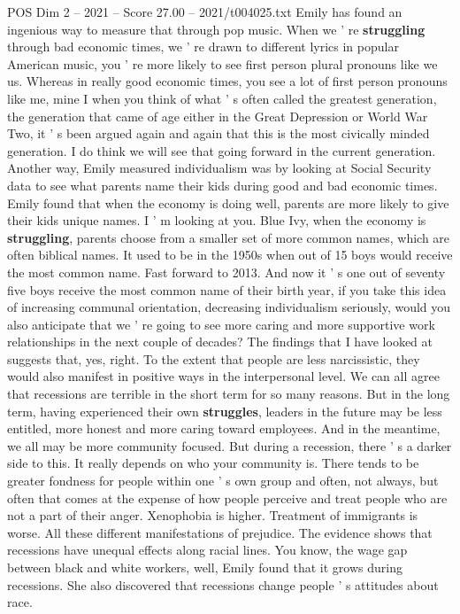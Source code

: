 \begin{textsample}{POS Dim 2 – 2021 – Score 27.00 – 2021/t004025.txt}
Emily has found an ingenious way to measure that through pop music.
When we ' re \textbf{struggling} through bad economic times, we ' re drawn to different lyrics in popular American music, you ' re more likely to see first person plural pronouns like we us.
Whereas in really good economic times, you see a lot of first person pronouns like me, mine I when you think of what ' s often called the greatest generation, the generation that came of age either in the Great Depression or World War Two, it ' s been argued again and again that this is the most civically minded generation.
I do think we will see that going forward in the current generation.
Another way, Emily measured individualism was by looking at Social Security data to see what parents name their kids during good and bad economic times.
Emily found that when the economy is doing well, parents are more likely to give their kids unique names.
I ' m looking at you.
Blue Ivy, when the economy is \textbf{struggling}, parents choose from a smaller set of more common names, which are often biblical names.
It used to be in the 1950s when out of 15 boys would receive the most common name.
Fast forward to 2013.
And now it ' s one out of seventy five boys receive the most common name of their birth year, if you take this idea of increasing communal orientation, decreasing individualism seriously, would you also anticipate that we ' re going to see more caring and more supportive work relationships in the next couple of decades?
The findings that I have looked at suggests that, yes, right.
To the extent that people are less narcissistic, they would also manifest in positive ways in the interpersonal level.
We can all agree that recessions are terrible in the short term for so many reasons.
But in the long term, having experienced their own \textbf{struggles}, leaders in the future may be less entitled, more honest and more caring toward employees.
And in the meantime, we all may be more community focused.
But during a recession, there ' s a darker side to this.
It really depends on who your community is.
There tends to be greater fondness for people within one ' s own group and often, not always, but often that comes at the expense of how people perceive and treat people who are not a part of their anger.
Xenophobia is higher.
Treatment of immigrants is worse.
All these different manifestations of prejudice.
The evidence shows that recessions have unequal effects along racial lines.
You know, the wage gap between black and white workers, well, Emily found that it grows during recessions.
She also discovered that recessions change people ' s attitudes about race.

\end{textsample}
